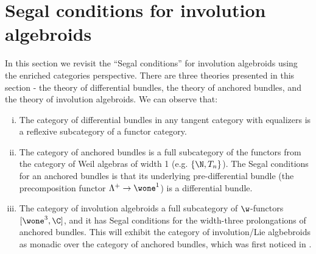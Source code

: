 \section{Segal conditions for involution algebroids}%
\label{sec:revisiting-segal-conds}

In this section we revisit the ``Segal conditions'' for involution algebroids using the enriched categories perspective. 
There are three theories presented in this section - the theory of differential bundles, the theory of anchored bundles, and the theory of involution algebroids.
We can observe that:
\begin{enumerate}[(i)]
    \item The category of differential bundles in any tangent category with equalizers is a reflexive subcategory of a functor category.
    \item The category of anchored bundles is a full subcategory of the functors from the category of Weil algebras of width 1 (e.g. $\{ \N, T_n \}$). The Segal conditions for an anchored bundles is that its underlying pre-differential bundle (the precomposition functor $\Lambda^+ \to \wone^1$) is a differential bundle.
    \item The category of involution algebroids a full subcategory of  $\w$-functors $[\wone^3, \C]$, and it has Segal conditions for the width-three prolongations of anchored bundles. This will exhibit the category of involution/Lie algbebroids as monadic over the category of anchored bundles, which was first noticed in \cite{Kapranov2007}.
\end{enumerate}
% 

